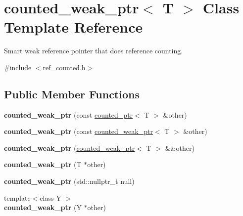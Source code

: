 \hypertarget{classcounted__weak__ptr}{}\section{counted\+\_\+weak\+\_\+ptr$<$ T $>$ Class Template Reference}
\label{classcounted__weak__ptr}


Smart weak reference pointer that does reference counting.  




{\ttfamily \#include $<$ref\+\_\+counted.\+h$>$}

\subsection*{Public Member Functions}
\begin{DoxyCompactItemize}
\item 
\hypertarget{classcounted__weak__ptr_a4f7a5da19027a74ea802487f46cf6bf1}{}{\bfseries counted\+\_\+weak\+\_\+ptr} (const \hyperlink{classcounted__ptr}{counted\+\_\+ptr}$<$ T $>$ \&other)\label{classcounted__weak__ptr_a4f7a5da19027a74ea802487f46cf6bf1}

\item 
\hypertarget{classcounted__weak__ptr_a72412e2074c5493fb394f50e7efa42bd}{}{\bfseries counted\+\_\+weak\+\_\+ptr} (const \hyperlink{classcounted__weak__ptr}{counted\+\_\+weak\+\_\+ptr}$<$ T $>$ \&other)\label{classcounted__weak__ptr_a72412e2074c5493fb394f50e7efa42bd}

\item 
\hypertarget{classcounted__weak__ptr_af9b3458facf4cb2f02647a9bfe94d38e}{}{\bfseries counted\+\_\+weak\+\_\+ptr} (\hyperlink{classcounted__weak__ptr}{counted\+\_\+weak\+\_\+ptr}$<$ T $>$ \&\&other)\label{classcounted__weak__ptr_af9b3458facf4cb2f02647a9bfe94d38e}

\item 
\hypertarget{classcounted__weak__ptr_ad67749a45fccbf95f884cdd71ac14d9b}{}{\bfseries counted\+\_\+weak\+\_\+ptr} (T $\ast$other)\label{classcounted__weak__ptr_ad67749a45fccbf95f884cdd71ac14d9b}

\item 
\hypertarget{classcounted__weak__ptr_adc31ecefcd181dedaa03146a794b36e4}{}{\bfseries counted\+\_\+weak\+\_\+ptr} (std\+::nullptr\+\_\+t null)\label{classcounted__weak__ptr_adc31ecefcd181dedaa03146a794b36e4}

\item 
\hypertarget{classcounted__weak__ptr_a4115b3ea317ffa21e59c1e8fc1504cca}{}{\footnotesize template$<$class Y $>$ }\\{\bfseries counted\+\_\+weak\+\_\+ptr} (Y $\ast$other)\label{classcounted__weak__ptr_a4115b3ea317ffa21e59c1e8fc1504cca}


\end{DoxyCompactItemize}
